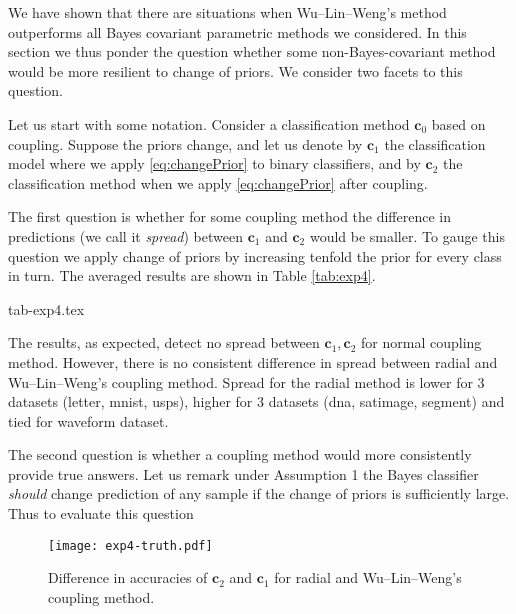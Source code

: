 We have shown that there are situations when Wu--Lin--Weng's method outperforms all Bayes covariant parametric methods we considered. In this section we thus ponder the question whether some non-Bayes-covariant method would be more resilient to change of priors. We consider two facets to this question.

Let us start with some notation. Consider a classification method $\boldsymbol{c}_0$ based on coupling. Suppose the priors change, and let us denote by $\boldsymbol{c}_1$ the classification model where we apply \eqref{eq:changePrior} to binary classifiers, and by $\boldsymbol{c}_2$ the classification method when we apply \eqref{eq:changePrior} after coupling. 

The first question is whether for some coupling method the difference in predictions (we call it \emph{spread}) between $\boldsymbol{c}_1$ and $\boldsymbol{c}_2$ would be smaller. To gauge this question we apply change of priors by increasing tenfold the prior for every class in turn.  The averaged results are shown in Table \ref{tab:exp4}. 

 {tab-exp4.tex}

The results, as expected, detect no spread between $\boldsymbol{c}_1, \boldsymbol{c}_2$ for normal coupling method. However, there is no consistent difference in spread between radial and Wu--Lin--Weng's coupling method. Spread for the radial method is lower for 3 datasets (letter, mnist, usps), higher for 3 datasets (dna, satimage, segment) and tied for waveform dataset.

The second question is whether a coupling method would more consistently provide true answers. Let us remark under Assumption 1 the Bayes classifier \emph{should} change prediction of any sample if the change of priors is sufficiently large. Thus to evaluate this question 

\begin{figure}[!ht]
	\texttt{[image: exp4-truth.pdf]}
	\caption{Difference in accuracies of $\boldsymbol{c}_2$ and $\boldsymbol{c}_1$ for radial and Wu--Lin--Weng's coupling method.}
	\label{fig:score}
\end{figure}
